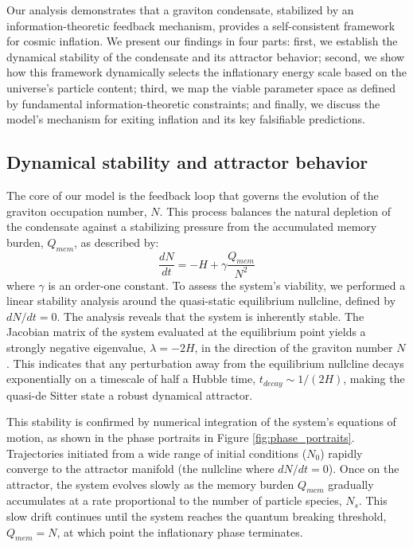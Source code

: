 \documentclass[]{article}
\begin{document}
Our analysis demonstrates that a graviton condensate, stabilized by an information-theoretic feedback mechanism, provides a self-consistent framework for cosmic inflation. We present our findings in four parts: first, we establish the dynamical stability of the condensate and its attractor behavior; second, we show how this framework dynamically selects the inflationary energy scale based on the universe's particle content; third, we map the viable parameter space as defined by fundamental information-theoretic constraints; and finally, we discuss the model's mechanism for exiting inflation and its key falsifiable predictions.

\subsection{Dynamical stability and attractor behavior}
The core of our model is the feedback loop that governs the evolution of the graviton occupation number, $N$. This process balances the natural depletion of the condensate against a stabilizing pressure from the accumulated memory burden, $Q_{mem}$, as described by:
\begin{equation}
    \frac{dN}{dt} = -H + \gamma \frac{Q_{mem}}{N^2}
    \label{eq:dNdt}
\end{equation}
where $\gamma$ is an order-one constant. To assess the system's viability, we performed a linear stability analysis around the quasi-static equilibrium nullcline, defined by $dN/dt = 0$. The analysis reveals that the system is inherently stable. The Jacobian matrix of the system evaluated at the equilibrium point yields a strongly negative eigenvalue, $\lambda = -2H$, in the direction of the graviton number $N$. This indicates that any perturbation away from the equilibrium nullcline decays exponentially on a timescale of half a Hubble time, $t_{decay} \sim 1/(2H)$, making the quasi-de Sitter state a robust dynamical attractor.

This stability is confirmed by numerical integration of the system's equations of motion, as shown in the phase portraits in Figure \ref{fig:phase_portraits}. Trajectories initiated from a wide range of initial conditions ($N_0$) rapidly converge to the attractor manifold (the nullcline where $dN/dt=0$). Once on the attractor, the system evolves slowly as the memory burden $Q_{mem}$ gradually accumulates at a rate proportional to the number of particle species, $N_s$. This slow drift continues until the system reaches the quantum breaking threshold, $Q_{mem} = N$, at which point the inflationary phase terminates.
\end{document}
